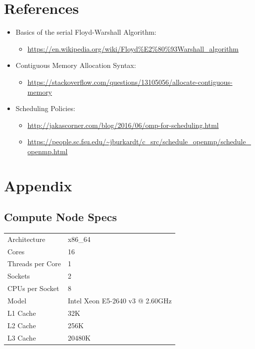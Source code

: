 \documentclass{article}
\begin{document}
\section{References}
\begin{itemize}
    \item Basics of the serial Floyd-Warshall Algorithm:
    \begin{itemize}
        \item \url{https://en.wikipedia.org/wiki/Floyd\%E2\%80\%93Warshall\_algorithm}
    \end{itemize}
    \item Contiguous Memory Allocation Syntax:
    \begin{itemize}
        \item \url{https://stackoverflow.com/questions/13105056/allocate-contiguous-memory}
    \end{itemize}
    \item Scheduling Policies:
    \begin{itemize}
        \item \url{http://jakascorner.com/blog/2016/06/omp-for-scheduling.html} 
        \item \url{https://people.sc.fsu.edu/~jburkardt/c\_src/schedule\_openmp/schedule\_openmp.html}
    \end{itemize}
    
    
\end{itemize}

\newpage
\section{Appendix}
\subsection*{Compute Node Specs}
\begin{table}[!h]
\centering
\begin{tabular}{|l|l|}
\hline
Architecture & x86\_64 \\
Cores & 16 \\
Threads per Core & 1 \\
Sockets  & 2 \\
CPUs per Socket  & 8 \\ 
Model & Intel Xeon E5-2640 v3 @ 2.60GHz \\
L1 Cache & 32K  \\
L2 Cache & 256K\\
L3 Cache & 20480K\\ \hline
\end{tabular}
\end{table}
\end{document}
